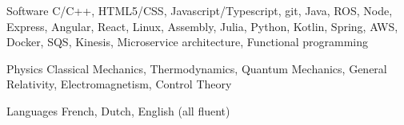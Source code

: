 


\begin{cvskills}


\cvskill
{Software} %
{C/C++, HTML5/CSS, Javascript/Typescript, git, Java, ROS, Node, Express, Angular, React, Linux, Assembly, Julia, Python, Kotlin, Spring, AWS, Docker, SQS, Kinesis, Microservice architecture, Functional programming} %


\cvskill
{Physics} %
{Classical Mechanics, Thermodynamics, Quantum Mechanics, General Relativity, Electromagnetism, Control Theory} %


\cvskill
{Languages} %
{French, Dutch, English (all fluent)} %


\end{cvskills}